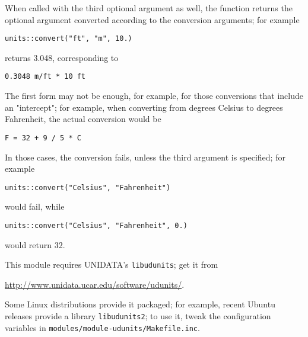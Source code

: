 When called with the third optional argument  as well, the function returns
the optional argument  converted according to the conversion arguments;
for example
\begin{Verbatim}[commandchars=\\\{\}]
    units::convert("ft", "m", 10.)
\end{Verbatim}
returns 3.048, corresponding to
\begin{Verbatim}[commandchars=\\\{\}]
    0.3048 m/ft * 10 ft
\end{Verbatim}

The first form may not be enough, for example, for those conversions
that include an "intercept"; for example, when converting from degrees 
Celsius to degrees Fahrenheit, the actual conversion would be
\begin{Verbatim}[commandchars=\\\{\}]
    F = 32 + 9 / 5 * C
\end{Verbatim}
In those cases, the conversion fails, unless the third argument 
is specified; for example
\begin{Verbatim}[commandchars=\\\{\}]
    units::convert("Celsius", "Fahrenheit")
\end{Verbatim}
would fail, while
\begin{Verbatim}[commandchars=\\\{\}]
    units::convert("Celsius", "Fahrenheit", 0.)
\end{Verbatim}
would return 32.

This module requires UNIDATA's \texttt{libudunits}; get it from
\begin{center}
\url{http://www.unidata.ucar.edu/software/udunits/}.
\end{center}
Some Linux distributions provide it packaged;
for example, recent Ubuntu releases provide a library \texttt{libudunits2};
to use it, tweak the configuration variables
in \texttt{modules/module-udunits/Makefile.inc}.



